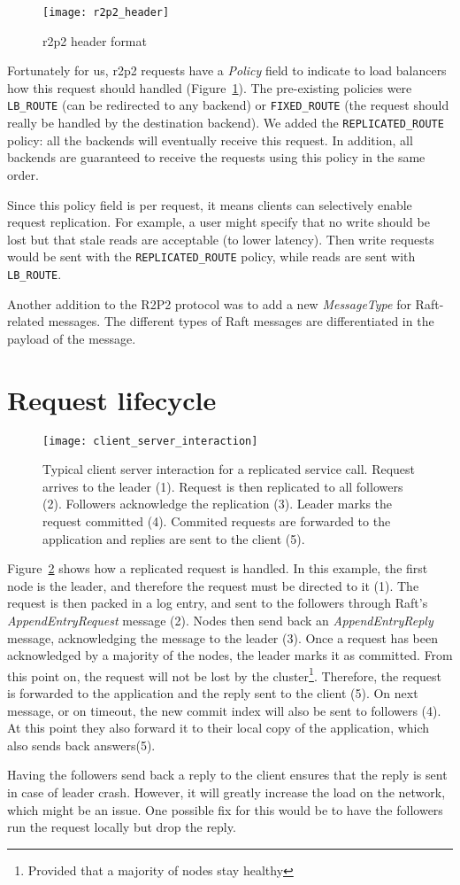 \begin{figure}[h]
    \centering
    \texttt{[image: r2p2\_header]}
    \caption{\gls{r2p2} header format\cite{r2p2}}
    \label{fig:r2p2-header}
\end{figure}


Fortunately for us, \gls{r2p2} requests have a \emph{Policy} field to indicate to load balancers how this request should handled (Figure~\ref{fig:r2p2-header}).
The pre-existing policies were \texttt{LB\_ROUTE} (can be redirected to any backend) or \texttt{FIXED\_ROUTE} (the request should really be handled by the destination backend).
We added the \texttt{REPLICATED\_ROUTE} policy: all the backends will eventually receive this request.
In addition, all backends are guaranteed to receive the requests using this policy in the same order.

Since this policy field is per request, it means clients can selectively enable request replication.
For example, a user might specify that no write should be lost but that stale reads are acceptable (to lower latency).
Then write requests would be sent with the \texttt{REPLICATED\_ROUTE} policy, while reads are sent with \texttt{LB\_ROUTE}.

Another addition to the R2P2 protocol was to add a new \emph{MessageType} for Raft-related messages.
The different types of Raft messages are differentiated in the payload of the message.

\section{Request lifecycle}

\begin{figure}[hp]
    \centering
    \texttt{[image: client\_server\_interaction]}
    \caption{Typical client server interaction for a replicated service call.
        Request arrives to the leader (1).
        Request is then replicated to all followers (2).
        Followers acknowledge the replication (3).
        Leader marks the request committed (4).
        Commited requests are forwarded to the application and replies are sent to the client (5).
    \label{fig:client-server-interaction}
    }
\end{figure}

Figure~\ref{fig:client-server-interaction} shows how a replicated request is handled.
In this example, the first node is the leader, and therefore the request must be directed to it (1).
The request is then packed in a log entry, and sent to the followers through Raft's \emph{AppendEntryRequest} message (2).
Nodes then send back an \emph{AppendEntryReply} message, acknowledging the message to the leader (3).
Once a request has been acknowledged by a majority of the nodes, the leader marks it as committed.
From this point on, the request will not be lost by the cluster\footnote{Provided that a majority of nodes stay healthy}.
Therefore, the request is forwarded to the application and the reply sent to the client (5).
On next message, or on timeout, the new commit index will also be sent to followers (4).
At this point they also forward it to their local copy of the application, which also sends back answers(5).

Having the followers send back a reply to the client ensures that the reply is sent in case of leader crash.
However, it will greatly increase the load on the network, which might be an issue.
One possible fix for this would be to have the followers run the request locally but drop the reply.


